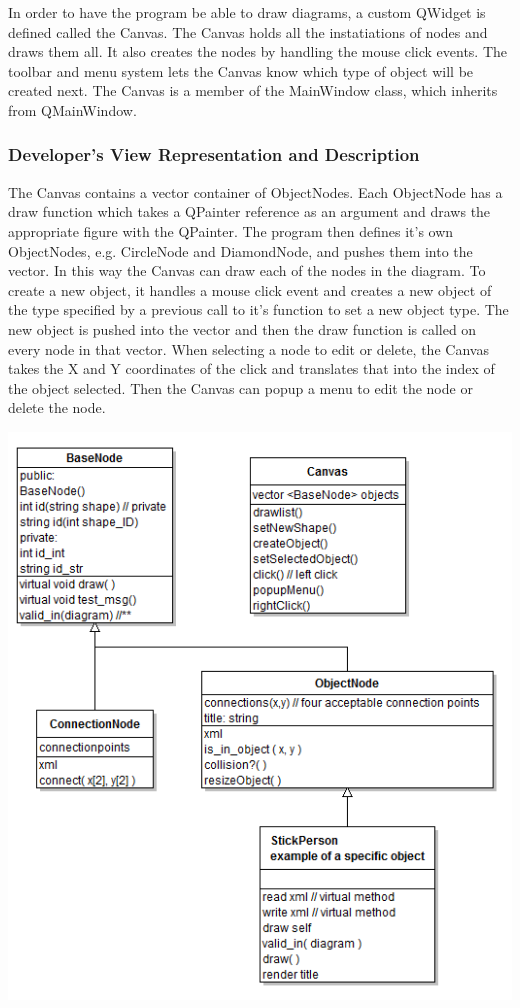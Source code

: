 \documentclass[twoside,letterpaper]{article}
\begin{document}
{{\color{black}
In order to have the program be able to draw diagrams, a custom QWidget
is defined called the Canvas. The Canvas holds all the instatiations of
nodes and draws them all. It also creates the nodes by handling the
mouse click events. The toolbar and menu system lets the Canvas know
which type of object will be created next. The Canvas is a member of
the MainWindow class, which inherits from QMainWindow. }

\subsubsection[Developer{\textquoteright}s View Representation and
Description ]{Developer{\textquoteright}s View Representation and
Description }

{\color{black}
The Canvas contains a vector container of
ObjectNodes. Each ObjectNode has a draw function which takes a QPainter
reference as an argument and draws the appropriate figure with the
QPainter. The program then defines it's own ObjectNodes, e.g. CircleNode
and DiamondNode, and pushes them into the vector. In this way the Canvas
can draw each of the nodes in the diagram. To create a new object, it
handles a mouse click event and creates a new object of the type specified
by a previous call to it's function to set a new object type. The new
object is pushed into the vector and then the draw function is called
on every node in that vector. When selecting a node to edit or delete,
the Canvas takes the X and Y coordinates of the click and translates that
into the index of the object selected. Then the Canvas can popup a menu
to edit the node or delete the node. }

{\centering\includegraphics[]{Canvas.png}}


}
\end{document}
